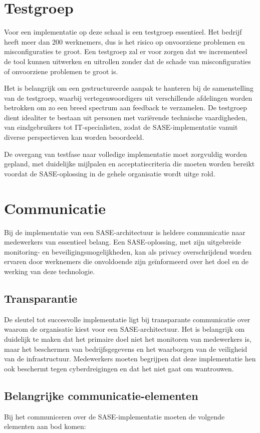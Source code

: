 \section{Testgroep}
Voor een implementatie op deze schaal is een testgroep essentieel. Het bedrijf heeft meer dan 200 werknemers, dus is het risico op onvoorziene problemen en misconfiguraties te groot. Een testgroep zal er voor zorgen dat we incrementeel de tool kunnen uitwerken en uitrollen zonder dat de schade van misconfiguraties of onvoorziene problemen te groot is.

Het is belangrijk om een gestructureerde aanpak te hanteren bij de samenstelling van de testgroep, waarbij vertegenwoordigers uit verschillende afdelingen worden betrokken om zo een breed spectrum aan feedback te verzamelen. De testgroep dient idealiter te bestaan uit personen met variërende technische vaardigheden, van eindgebruikers tot IT-specialisten, zodat de SASE-implementatie vanuit diverse perspectieven kan worden beoordeeld.

De overgang van testfase naar volledige implementatie moet zorgvuldig worden gepland, met duidelijke mijlpalen en acceptatiecriteria die moeten worden bereikt voordat de SASE-oplossing in de gehele organisatie wordt uitge rold.

\section{Communicatie}
Bij de implementatie van een SASE-architectuur is heldere communicatie naar medewerkers van essentieel belang. Een SASE-oplossing, met zijn uitgebreide monitoring- en beveiligingsmogelijkheden, kan als privacy overschrijdend worden ervaren door werknemers die onvoldoende zijn geïnformeerd over het doel en de werking van deze technologie.

\subsection{Transparantie}
De sleutel tot succesvolle implementatie ligt bij transparante communicatie over waarom de organisatie kiest voor een SASE-architectuur. Het is belangrijk om duidelijk te maken dat het primaire doel niet het monitoren van medewerkers is, maar het beschermen van bedrijfsgegevens en het waarborgen van de veiligheid van de infrastructuur. Medewerkers moeten begrijpen dat deze implementatie hen ook beschermt tegen cyberdreigingen en dat het niet gaat om wantrouwen.

\subsection{Belangrijke communicatie-elementen}
Bij het communiceren over de SASE-implementatie moeten de volgende elementen aan bod komen:

